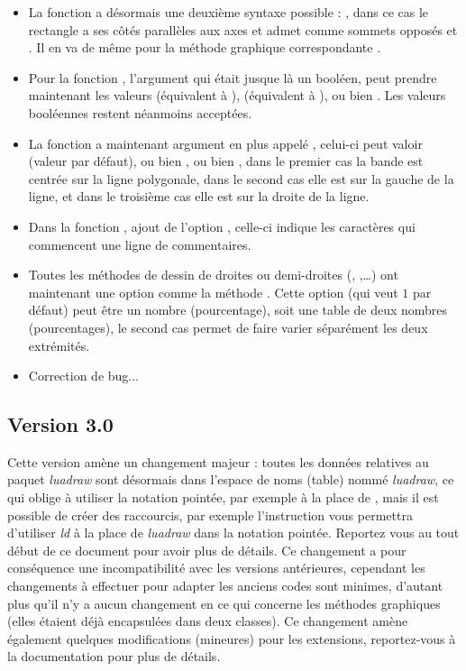 \begin{itemize}
    \item La fonction  a désormais une deuxième syntaxe possible : , dans ce cas le rectangle a ses côtés parallèles aux axes et admet comme sommets opposés  et . Il en va de même pour la méthode graphique correspondante .
    
    \item Pour la fonction , l'argument  qui était jusque là un booléen, peut prendre maintenant les valeurs  (équivalent à \false),  (équivalent à \true), ou bien . Les valeurs booléennes restent néanmoins acceptées.
    
    \item La fonction  a maintenant argument en plus appelé , celui-ci peut valoir  (valeur par défaut), ou bien , ou bien , dans le premier cas la bande est centrée sur la ligne polygonale, dans le second cas elle est sur la gauche de la ligne, et dans le troisième cas elle est sur la droite de la ligne.
    
    \item Dans la fonction , ajout de l'option , celle-ci indique les caractères qui commencent une ligne de commentaires.
    
    \item Toutes les méthodes de dessin de droites ou demi-droites (, ,\ldots) ont maintenant une option  comme la méthode . Cette option (qui veut $1$ par défaut) peut être un nombre (pourcentage), soit une table de deux nombres (pourcentages), le second cas permet de faire varier séparément les deux extrémités.
    
    \item Correction de bug...
\end{itemize}

\subsection{Version 3.0}
Cette version amène un changement majeur : toutes les données relatives au paquet \emph{luadraw} sont désormais dans l'espace de noms (table) nommé \emph{luadraw}, ce qui oblige à utiliser la notation pointée, par exemple  à la place de , mais il est possible de créer des raccourcis, par exemple l'instruction  vous permettra d'utiliser \emph{ld} à la place de \emph{luadraw} dans la notation pointée. Reportez vous au tout début de ce document pour avoir plus de détails.
Ce changement a pour conséquence une incompatibilité avec les versions antérieures, cependant les changements à effectuer pour adapter les anciens codes sont minimes, d'autant plus qu'il n'y a aucun changement en ce qui concerne les méthodes graphiques (elles étaient déjà encapsulées dans deux classes).
Ce changement amène également quelques modifications (mineures) pour les extensions, reportez-vous à la documentation pour plus de détails.

